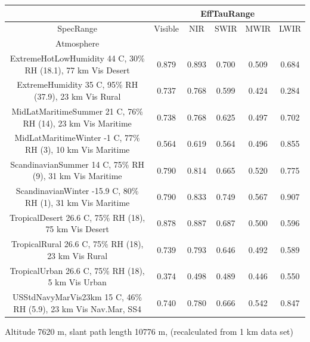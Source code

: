 \documentclass{workpackage}
\begin{document}
\begin{center}

\begin{footnotesize}

\begin{tabular}{|c|c|c|c|c|c|}
\hline
&\multicolumn{5}{|c|}{EffTauRange}\\\hline
SpecRange&Visible&NIR&SWIR&MWIR&LWIR\\\hline
Atmosphere&&&&&\\\hline
ExtremeHotLowHumidity 44 C, 30\% RH (18.1), 77 km Vis Desert&0.879&0.893&0.700&0.509&0.684\\\hline
ExtremeHumidity 35 C, 95\% RH (37.9), 23 km Vis Rural&0.737&0.768&0.599&0.424&0.284\\\hline
MidLatMaritimeSummer 21 C, 76\% RH (14), 23 km Vis Maritime&0.738&0.768&0.625&0.497&0.702\\\hline
MidLatMaritimeWinter -1 C, 77\% RH (3), 10 km Vis Maritime&0.564&0.619&0.564&0.496&0.855\\\hline
ScandinavianSummer 14 C, 75\% RH (9), 31 km Vis Maritime&0.790&0.814&0.665&0.520&0.775\\\hline
ScandinavianWinter -15.9 C, 80\% RH (1), 31 km Vis Maritime&0.790&0.833&0.749&0.567&0.907\\\hline
TropicalDesert 26.6 C, 75\% RH (18), 75 km Vis Desert&0.878&0.887&0.687&0.500&0.596\\\hline
TropicalRural 26.6 C, 75\% RH (18), 23 km Vis Rural&0.739&0.793&0.646&0.492&0.589\\\hline
TropicalUrban 26.6 C, 75\% RH (18), 5 km Vis Urban&0.374&0.498&0.489&0.446&0.550\\\hline
USStdNavyMarVis23km 15 C, 46\% RH (5.9), 23 km Vis Nav.Mar, SS4&0.740&0.780&0.666&0.542&0.847\\\hline

\end{tabular}
\end{footnotesize}
\end{center}



Altitude 7620 m, slant path length 10776 m, (recalculated from 1 km data set)
\end{document}
